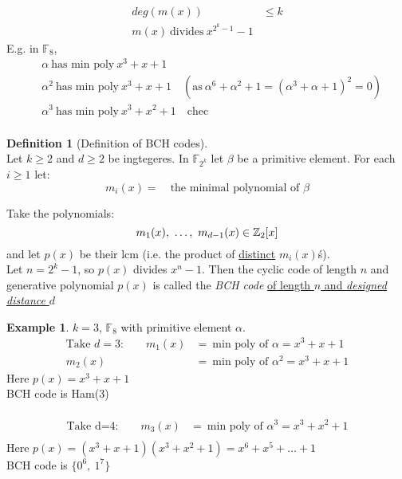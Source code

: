\documentclass[]{article}
\theoremstyle{definition}
\newtheorem*{defn}{Definition}
\newtheorem*{exmp}{Example}
\theoremstyle{remark}
\numberwithin{equation}{section}
\begin{document}
\begin{itemize}
\begin{align*}
						deg(m(x)) &\leq k\\
						m(x)\ \text{divides}\ x^{2^k-1} -1
					\end{align*}
					E.g. in $\mathbb{F}_8$,\\
					\begin{align*}
						&\alpha \ \text{has min poly}\ x^3 + x + 1\\
						&\alpha^2 \ \text{has min poly}\ x^3 + x + 1 \quad (\text{as}\ \alpha^6 + \alpha^2 + 1 = (\alpha^3 + \alpha + 1)^2 = 0)\\
						&\alpha^3 \ \text{has min poly}\ x^3 + x^2 + 1\quad \text{chec}\\
					\end{align*}
				\end{itemize}
				\begin{defn}[Definition of BCH codes]\hfill\\
					Let $k\geq 2$ and $d \geq 2$ be ingtegeres. In $\mathbb{F}_{2^k}$ let $\beta$ be a primitive element. For each $i \geq 1$ let:
					\[
						m_i(x) = \quad \text{the minimal polynomial of $\beta$}
					\]

					Take the polynomials:
					\[
						m_1(x),\ \hdots,\ m_{d-1}(x) \in \ZZb[x]
					\]
					and let $p(x)$ be their lcm (i.e. the product of \underline{distinct} $m_i(x)$\'s).
					\\
					Let $n=2^k-1$, so $p(x)$ divides $x^n -1$. Then the cyclic code of length $n$ and generative polynomial $p(x)$ is called the \emph{BCH code} \underline{of length $n$ and \emph{designed distance} $d$}
				\end{defn}
				\begin{exmp}
					$k=3$, $\mathbb{F}_8$ with primitive element $\alpha$.\\
					\begin{align*}
						\text{Take $d=3$:} \qquad m_1(x) &=\ \text{min poly of $\alpha$} = x^3 + x + 1\\
												m_2(x) &=\ \text{min poly of $\alpha^2$} = x^3 + x + 1
					\end{align*}
					Here $p(x) = x^3 + x + 1$\\
					BCH code is Ham(3)\\
					\\
					\begin{align*}
						\text{Take d=4:} \qquad m_3(x) &=\ \text{min poly of $\alpha^3$} = x^3 + x^2 + 1\\
					\end{align*}
					Here $p(x) = (x^3 + x + 1)(x^3+x^2+1) = x^6+x^5+\hdots+1$\\
					BCH code is $\{0^6,\ 1^7\}$\\
				\end{exmp}
\end{document}
